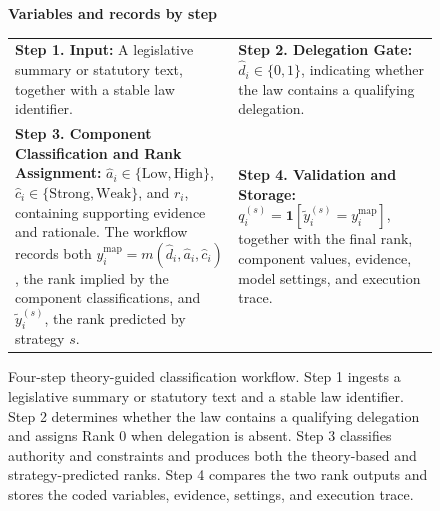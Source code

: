 \begin{figure}[t]

\vspace{0.55em}

\begin{minipage}{0.97\textwidth}
\centering
\footnotesize
\textbf{Variables and records by step}

\vspace{0.35em}

\begin{tabularx}{\textwidth}{@{}>{\raggedright\arraybackslash}X@{\hspace{1.2em}}>{\raggedright\arraybackslash}X@{}}

\textbf{Step 1. Input:}
A legislative summary or statutory text, together with a stable law identifier.
&
\textbf{Step 2. Delegation Gate:}
$\hat d_i\in\{0,1\}$, indicating whether the law contains a qualifying delegation.
\\[0.55em]

\textbf{Step 3. Component Classification and Rank Assignment:}
$\hat a_i\in\{\mathrm{Low},\mathrm{High}\}$,
$\hat c_i\in\{\mathrm{Strong},\mathrm{Weak}\}$, and $r_i$, containing supporting evidence and rationale. The workflow records both
$y_i^{\mathrm{map}}=m(\hat d_i,\hat a_i,\hat c_i)$, the rank implied by the component classifications, and $\tilde y_i^{(s)}$, the rank predicted by strategy $s$.
&
\textbf{Step 4. Validation and Storage:}
$q_i^{(s)}=\mathbf{1}[\tilde y_i^{(s)}=y_i^{\mathrm{map}}]$, together with the final rank, component values, evidence, model settings, and execution trace.
\\

\end{tabularx}
\end{minipage}

\caption{Four-step theory-guided classification workflow. Step 1 ingests a legislative summary or statutory text and a stable law identifier. Step 2 determines whether the law contains a qualifying delegation and assigns Rank 0 when delegation is absent. Step 3 classifies authority and constraints and produces both the theory-based and strategy-predicted ranks. Step 4 compares the two rank outputs and stores the coded variables, evidence, settings, and execution trace.}
\label{fig:theory_guided_workflow}
\end{figure}


